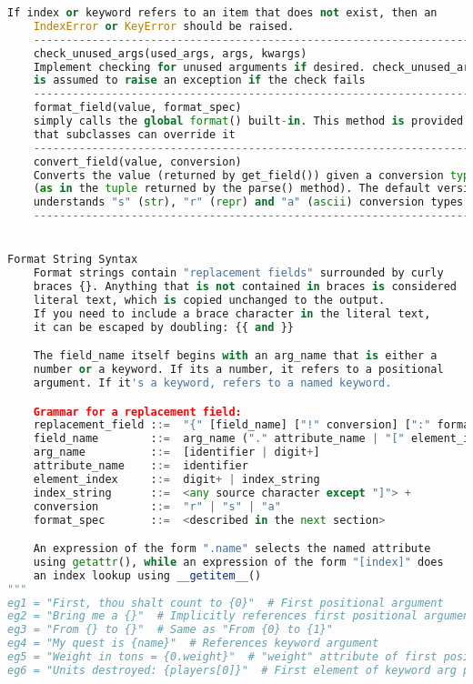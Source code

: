 \documentclass[a4paper,landscape]{report}
\begin{document}
\begin{lstlisting}[language=Python]
    If index or keyword refers to an item that does not exist, then an
    IndexError or KeyError should be raised.
    ----------------------------------------------------------------------
    check_unused_args(used_args, args, kwargs)
    Implement checking for unused arguments if desired. check_unused_args()
    is assumed to raise an exception if the check fails
    ----------------------------------------------------------------------
    format_field(value, format_spec)
    simply calls the global format() built-in. This method is provided so
    that subclasses can override it
    ----------------------------------------------------------------------
    convert_field(value, conversion)
    Converts the value (returned by get_field()) given a conversion type
    (as in the tuple returned by the parse() method). The default version
    understands "s" (str), "r" (repr) and "a" (ascii) conversion types
    ----------------------------------------------------------------------


Format String Syntax
    Format strings contain "replacement fields" surrounded by curly
    braces {}. Anything that is not contained in braces is considered
    literal text, which is copied unchanged to the output.
    If you need to include a brace character in the literal text,
    it can be escaped by doubling: {{ and }}

    The field_name itself begins with an arg_name that is either a
    number or a keyword. If its a number, it refers to a positional
    argument. If it's a keyword, refers to a named keyword.

    Grammar for a replacement field:
    replacement_field ::=  "{" [field_name] ["!" conversion] [":" format_spec] "}"
    field_name        ::=  arg_name ("." attribute_name | "[" element_index "]")*
    arg_name          ::=  [identifier | digit+]
    attribute_name    ::=  identifier
    element_index     ::=  digit+ | index_string
    index_string      ::=  <any source character except "]"> +
    conversion        ::=  "r" | "s" | "a"
    format_spec       ::=  <described in the next section>

    An expression of the form ".name" selects the named attribute
    using getattr(), while an expression of the form "[index]" does
    an index lookup using __getitem__()
"""
eg1 = "First, thou shalt count to {0}"  # First positional argument
eg2 = "Bring me a {}"  # Implicitly references first positional argument
eg3 = "From {} to {}"  # Same as "From {0} to {1}"
eg4 = "My quest is {name}"  # References keyword argument
eg5 = "Weight in tons = {0.weight}"  # "weight" attribute of first positional arg
eg6 = "Units destroyed: {players[0]}"  # First element of keyword arg players



\end{lstlisting}
\end{document}
